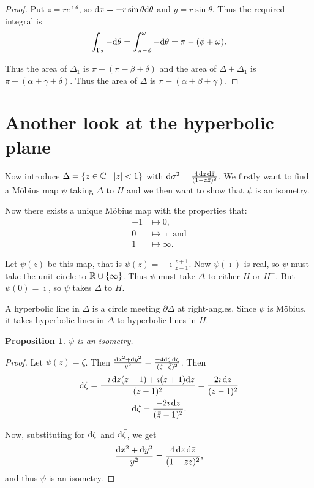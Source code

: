\documentclass{notes}
\theoremstyle{plain}
\newtheorem{proposition}{Proposition}[chapter]
\begin{document}
\begin{proof}
Put $z = r e^{\imath \theta}$, so $\mathrm{d} x = -r \sin \theta \mathrm{d}\theta$ and 
$y = r \sin \theta$.  Thus the required integral is
\[
\int_{\Gamma_2} -\mathrm{d}\theta = \int_{\pi - \phi}^\omega - \mathrm{d}\theta
= \pi - (\phi + \omega).
\]

Thus the area of $\Delta_1$ is $\pi - (\pi - \beta + \delta)$ and the
area of $\Delta + \Delta_1$ is $\pi - (\alpha + \gamma + \delta)$.  Thus
the area of $\Delta$ is $\pi - (\alpha + \beta + \gamma)$.
\end{proof}

\section{Another look at the hyperbolic plane}

Now introduce $\Delta = \{ z \in \mathbb{C} \mid \left|z\right| < 1 \}$ with
$\mathrm{d}\sigma^2 = \frac{4\, \mathrm{d} z\, \mathrm{d}\Bar{z}}{(1-z\Bar{z})^2}$.  We
firstly want to find a M\"{o}bius map $\psi$ taking $\Delta$ to $H$
and we then want to show that $\psi$ is an isometry.

Now there exists a unique M\"{o}bius map with the properties that:
\begin{align*}
-1 &\mapsto 0, \\
0 &\mapsto \imath \text{ and} \\
1 &\mapsto \infty.
\end{align*}

Let $\psi(z)$ be this map, that is $\psi(z) = -\imath \frac{z+1}{z-1}$.  Now
$\psi(\imath)$ is real, so $\psi$ must take the unit circle to $\mathbb{R} \cup
\{ \infty \}$.  Thus $\psi$ must take $\Delta$ to either $H$ or $H^-$.  But
$\psi(0) = \imath$, so $\psi$ takes $\Delta$ to $H$.

A hyperbolic line in $\Delta$ is a circle meeting $\partial \Delta$ at
right-angles.  Since $\psi$ is M\"{o}bius, it takes hyperbolic lines in
$\Delta$ to hyperbolic lines in $H$.

\begin{proposition}
$\psi$ is an isometry.
\end{proposition}

\begin{proof}
Let $\psi(z) = \zeta$.  Then $\frac{\mathrm{d} x^2 + \mathrm{d} y^2}{y^2} = \frac{-4 \mathrm{d}\zeta\,
\mathrm{d}\Bar{\zeta}}{(\zeta-\Bar{\zeta})^2}$.  Then
\begin{gather*}
  \mathrm{d}\zeta = \frac{-\imath\, \mathrm{d} z (z-1) + \imath (z+1) \mathrm{d}
    z}{(z-1)^2} = \frac{2 \imath
    \, \mathrm{d} z}{(z-1)^2}\\
  \mathrm{d}\Bar{\zeta} = \frac{-2 \imath\, \mathrm{d}\Bar{z}}{(\Bar{z}-1)^2}.
\end{gather*}

Now, substituting for $\mathrm{d}\zeta$ and $\mathrm{d}\Bar{\zeta}$, we get
\[
\frac{\mathrm{d} x^2 + \mathrm{d} y^2}{y^2} = \frac{4\, \mathrm{d} z\, \mathrm{d}\Bar{z}}{(1-z\Bar{z})^2},
\]
and thus $\psi$ is an isometry.
\end{proof}
\end{document}
